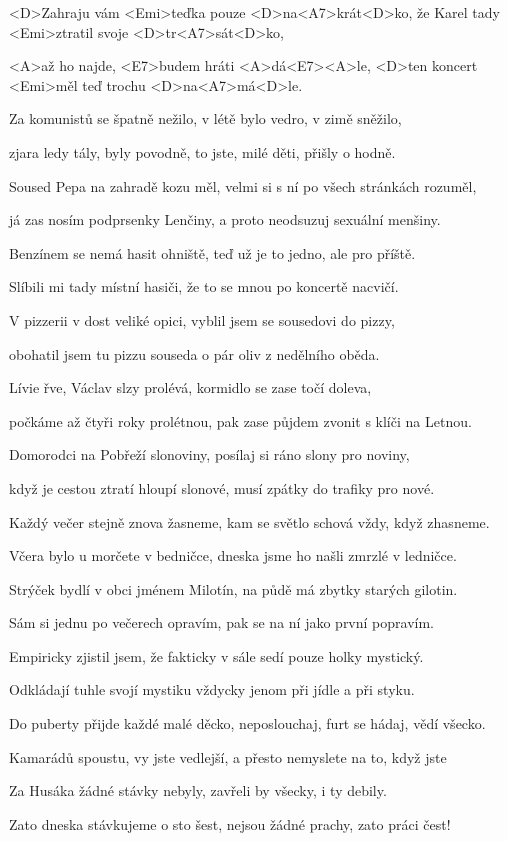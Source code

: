 

\zs
<D>Zahraju vám <Emi>teďka pouze <D>na<A7>krát<D>ko,
že Karel tady <Emi>ztratil svoje <D>tr<A7>sát<D>ko,

<A>až ho najde, <E7>budem hráti <A>dá<E7><A>le,
<D>ten koncert <Emi>měl teď trochu <D>na<A7>má<D>le.
\ks

\zs
Za komunistů se špatně nežilo,
v létě bylo vedro, v zimě sněžilo,

zjara ledy tály, byly povodně,
to jste, milé děti, přišly o hodně.
\ks

\zs
Soused Pepa na zahradě kozu měl,
velmi si s ní po všech stránkách rozuměl,

já zas nosím podprsenky Lenčiny,
a proto neodsuzuj sexuální menšiny.
\ks

\zs
Benzínem se nemá hasit ohniště,
teď už je to jedno, ale pro příště.

Slíbili mi tady místní hasiči,
že to se mnou po koncertě nacvičí.
\ks

\zs
V pizzerii v dost veliké opici,
vyblil jsem se sousedovi do pizzy,

obohatil jsem tu pizzu souseda
o pár oliv z nedělního oběda.
\ks

\zs
Lívie řve, Václav slzy prolévá,
kormidlo se zase točí doleva,

počkáme až čtyři roky prolétnou,
pak zase půjdem zvonit s klíči na Letnou.
\ks

\zs
Domorodci na Pobřeží slonoviny,
posílaj si ráno slony pro noviny,

když je cestou ztratí hloupí slonové,
musí zpátky do trafiky pro nové.
\ks

\zs
Každý večer stejně znova žasneme,
kam se světlo schová vždy, když zhasneme.

Včera bylo u morčete v bedničce,
dneska jsme ho našli zmrzlé v ledničce.
\ks

\zs
Strýček bydlí v obci jménem Milotín,
na půdě má zbytky starých gilotin.

Sám si jednu po večerech opravím,
pak se na ní jako první popravím.
\ks

\zs
Empiricky zjistil jsem, že fakticky
v sále sedí pouze holky mystický.

Odkládají tuhle svojí mystiku
vždycky jenom při jídle a při styku.
\ks

\zs
Do puberty přijde každé malé děcko,
neposlouchaj, furt se hádaj, vědí všecko.

Kamarádů spoustu, vy jste vedlejší,
a přesto nemyslete na to, když jste 
\ks

\zs
Za Husáka žádné stávky nebyly,
zavřeli by všecky, i ty debily.

Zato dneska stávkujeme o sto šest,
nejsou žádné prachy, zato práci čest!
\ks
\kp
